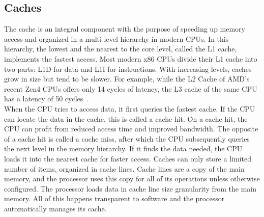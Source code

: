 \subsection{Caches}
\label{sec:state:technical:caches}


The cache is an integral component with the purpose of speeding up memory access
and organized in a multi-level hierarchy in modern CPUs. In this hierarchy, the
lowest and the nearest to the core level, called the L1 cache, implements the
fastest access. Most modern x86 CPUs divide their L1 cache into two parts: L1D
for data and L1I for instructions. With increasing levels, caches grow in size
but tend to be slower. For example, while the L2 Cache of AMD's recent Zen4 CPUs
offers only 14 cycles of latency, the L3 cache of the same CPU has a latency of
50 cycles~\cite{zen4}.\\

When the CPU tries to access data, it first queries the fastest cache. If the
CPU can locate the data in the cache, this is called a cache hit. On a cache
hit, the CPU can profit from reduced access time and improved bandwidth. The
opposite of a cache hit is called a cache miss, after which the CPU subsequently
queries the next level in the memory hierarchy. If it finds the data needed, the
CPU loads it into the nearest cache for faster access. Caches can only store a
limited number of items, organized in cache lines. Cache lines are a copy of the
main memory, and the processor uses this copy for all of its operations unless
otherwise configured. The processor loads data in cache line size granularity
from the main memory. All of this happens transparent to software and the
processor automatically manages its cache. \\

